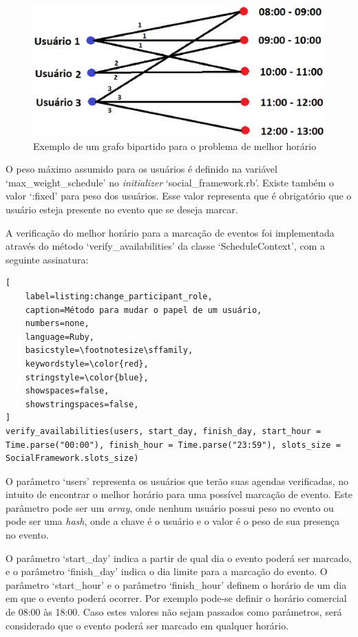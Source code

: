 \begin{figure}[h]
    \centering
    \includegraphics[scale=0.6]{figuras/social_framework/melhor_horario.eps}
    \caption{Exemplo de um grafo bipartido para o problema de melhor horário}
    \label{melhor_horario}
\end{figure}

O peso máximo assumido para os usuários é definido na variável `max\_weight\_schedule' no \textit{initializer} `social\_framework.rb'. Existe também o valor `:fixed' para peso dos usuários. Esse valor representa que é obrigatório que o usuário esteja presente no evento que se deseja marcar.

A verificação do melhor horário para a marcação de eventos foi implementada através do método `verify\_availabilities' da classe `ScheduleContext', com a seguinte assinatura:

\begin{lstlisting}[
    label=listing:change_participant_role,
    caption=Método para mudar o papel de um usuário,
    numbers=none,
    language=Ruby,
    basicstyle=\footnotesize\sffamily,
    keywordstyle=\color{red},
    stringstyle=\color{blue},
    showspaces=false,
    showstringspaces=false,
]
verify_availabilities(users, start_day, finish_day, start_hour = Time.parse("00:00"), finish_hour = Time.parse("23:59"), slots_size = SocialFramework.slots_size)
\end{lstlisting}

O parâmetro `users' representa os usuários que terão suas agendas verificadas, no intuito de encontrar o melhor horário para uma possível marcação de evento. Este parâmetro pode ser um \textit{array}, onde nenhum usuário possui peso no evento ou pode ser uma \textit{hash}, onde a chave é o usuário e o valor é o peso de sua presença no evento.

O parâmetro `start\_day' indica a partir de qual dia o evento poderá ser marcado, e o parâmetro `finish\_day' indica o dia limite para a marcação do evento. O parâmetro `start\_hour' e o parâmetro `finish\_hour' definem o horário de um dia em que o evento poderá ocorrer. Por exemplo pode-se definir o horário comercial de 08:00 às 18:00. Caso estes valores não sejam passados como parâmetros, será considerado que o evento poderá ser marcado em qualquer horário.

